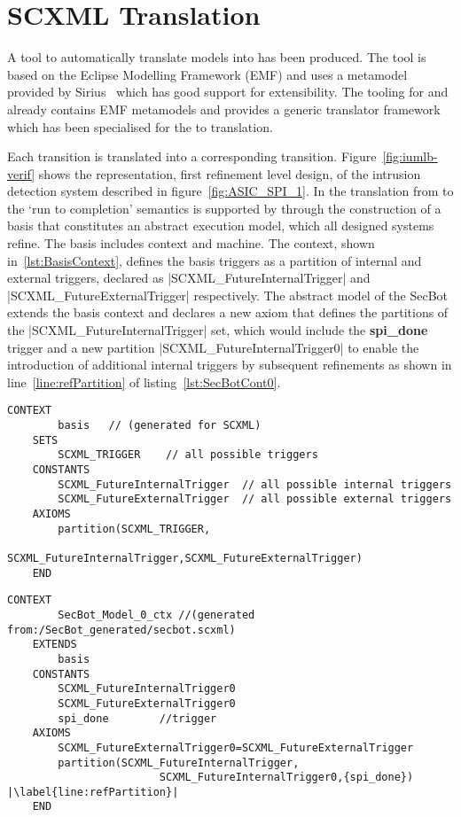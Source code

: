 \section{SCXML Translation}
\label{sec:translation}

A tool to automatically translate \SCXML models into \iUMLB has been produced. 
The tool is based on the Eclipse Modelling Framework (EMF) and uses a \SCXML metamodel provided by Sirius~\cite{siriuswebsite} which has good support for extensibility. 
The tooling for \iUMLB and \EventB already contains EMF metamodels and provides a generic translator framework which has been specialised for the \SCXML to \iUMLB translation. 

Each \SCXML transition is translated into a corresponding \iUMLB transition. 
Figure~\ref{fig:iumlb-verif} shows the \iUMLB representation, first refinement level design, of the intrusion detection system described in
figure~\ref{fig:ASIC_SPI_1}. 
In the translation from \iUMLB to \EventB the `run to completion' semantics is supported by \EventB through the construction of a basis that constitutes an abstract execution model, which all designed systems refine. 
The basis includes \EventB context and machine. 
The context, shown in~\ref{lst:BasisContext}, defines the basis triggers as a partition of internal and external triggers, declared as |SCXML_FutureInternalTrigger| and |SCXML_FutureExternalTrigger| respectively. 
The abstract model of the SecBot extends the basis context and declares a new axiom that defines the partitions of the |SCXML_FutureInternalTrigger| set, which would include the \textbf{spi\_done} trigger and a new partition |SCXML_FutureInternalTrigger0| to enable the introduction of additional internal triggers by subsequent refinements as shown in line~\ref{line:refPartition} of listing~\ref{lst:SecBotCont0}. 

\begin{lstlisting}[caption={Abstract basis context},label={lst:BasisContext}, language=Event-B, escapechar=|, frame=single]
	CONTEXT
		basis 	// (generated for SCXML)
	SETS
		SCXML_TRIGGER	 // all possible triggers
	CONSTANTS
		SCXML_FutureInternalTrigger	 // all possible internal triggers
		SCXML_FutureExternalTrigger	 // all possible external triggers  
	AXIOMS
		partition(SCXML_TRIGGER,
				SCXML_FutureInternalTrigger,SCXML_FutureExternalTrigger) 
	END
\end{lstlisting}	

\begin{lstlisting}[caption={Context for intrusion detection system abstract model},label={lst:SecBotCont0}, language=Event-B, escapechar=|, frame=single]
	CONTEXT
		SecBot_Model_0_ctx //(generated from:/SecBot_generated/secbot.scxml)
	EXTENDS
		basis 
	CONSTANTS
		SCXML_FutureInternalTrigger0	
		SCXML_FutureExternalTrigger0
		spi_done	 	//trigger
	AXIOMS
		SCXML_FutureExternalTrigger0=SCXML_FutureExternalTrigger
		partition(SCXML_FutureInternalTrigger,
						SCXML_FutureInternalTrigger0,{spi_done}) |\label{line:refPartition}|
	END
\end{lstlisting}

